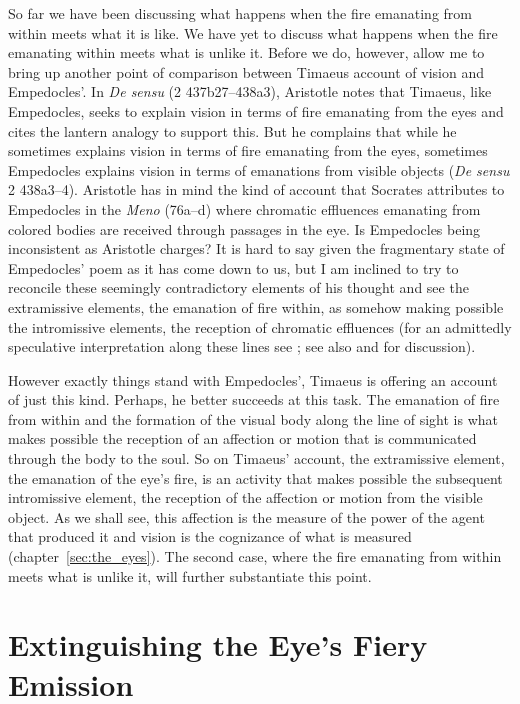 So far we have been discussing what happens when the fire emanating from within meets what it is like. We have yet to discuss what happens when the fire emanating within meets what is unlike it. Before we do, however, allow me to bring up another point of comparison between Timaeus account of vision and Empedocles'. In \emph{De sensu} (2 437b27--438a3), Aristotle notes that Timaeus, like Empedocles, seeks to explain vision in terms of fire emanating from the eyes and cites the lantern analogy to support this. But he complains that while he sometimes explains vision in terms of fire emanating from the eyes, sometimes Empedocles explains vision in terms of emanations from visible objects (\emph{De sensu} 2 438a3--4). Aristotle has in mind the kind of account that Socrates attributes to Empedocles in the \emph{Meno} (76a--d) where chromatic effluences emanating from colored bodies are received through passages in the eye. Is Empedocles being inconsistent as Aristotle charges? It is hard to say given the fragmentary state of Empedocles' poem as it has come down to us, but I am inclined to try to reconcile these seemingly contradictory elements of his thought and see the extramissive elements, the emanation of fire within, as somehow making possible the intromissive elements, the reception of chromatic effluences (for an admittedly speculative interpretation along these lines see \citealt[chapter 1.3]{Kalderon:2015fr}; see also \citealt[152 n5]{Hammond:1903aa} and \citealt[137]{Ross:1906fk} for discussion). 

However exactly things stand with Empedocles', Timaeus is offering an account of just this kind. Perhaps, he better succeeds at this task. The emanation of fire from within and the formation of the visual body along the line of sight is what makes possible the reception of an affection or motion that is communicated through the body to the soul. So on Timaeus' account, the extramissive element, the emanation of the eye's fire, is an activity that makes possible the subsequent intromissive element, the reception of the affection or motion from the visible object. As we shall see, this affection is the measure of the power of the agent that produced it and vision is the cognizance of what is measured (chapter~\ref{sec:the_eyes}). The second case, where the fire emanating from within meets what is unlike it, will further substantiate this point.


\section{Extinguishing the Eye's Fiery Emission} %
\label{sec:the_quenching_of_the_eye_s_fire}

